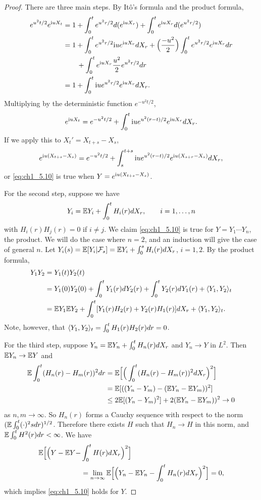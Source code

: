 \begin{proof}
There are three main steps. By It\^o's formula and the product formula,
\begin{align*}
    e^{u^2t/2}e^{\mathrm{i} uX_t} &= 1 + \int_0^t e^{u^2r/2}d(e^{\mathrm{i} u X_r}) + \int_0^t e^{\mathrm{i} u X_r}d(e^{u^2r/2}) \\
    &= 1 + \int_0^t e^{u^2r/2}\mathrm{i} ue^{\mathrm{i} uX_r}dX_r + \Big(\frac{-u^2}{2}\Big)\int_0^t e^{u^2r/2}e^{\mathrm{i} uX_r}dr \\
    &\qquad + \int_0^t e^{\mathrm{i} u X_r}\frac{u^2}{2}e^{u^2 r/2}dr \\
    &= 1 + \int_0^t \mathrm{i} ue^{u^2r/2}e^{\mathrm{i} uX_r}dX_r.
\end{align*}
Multiplying by the deterministic function $e^{-u^2t/2}$,
\[
    e^{\mathrm{i} uX_t} = e^{-u^2t/2} + \int_0^t \mathrm{i} ue^{u^2(r-t)/2}e^{\mathrm{i} uX_r}dX_r.
\]
If we apply this to $X_t'=X_{t+s}-X_s$,
\begin{equation}\label{eq:ch1_5.11}
    e^{\mathrm{i} u(X_{t+s}-X_s)} = e^{-u^2t/2} + \int_s^{t+s} \mathrm{i} ue^{u^2(r-t)/2}e^{\mathrm{i} u(X_{s+r}-X_s)}dX_r,
\end{equation}
or \eqref{eq:ch1_5.10} is true when $Y = e^{\mathrm{i} u(X_{t+s}-X_s)}$.

For the second step, suppose we have
\[
    Y_i = \mathbb{E} Y_i + \int_0^t H_i(r)dX_r, \qquad i=1,\ldots,n
\]
with $H_i(r)H_j(r) = 0$ if $i \neq j$. We claim \eqref{eq:ch1_5.10} is true for $Y = Y_1\cdots Y_n$, the product. We will do the case where $n = 2$, and an induction will give the case of general $n$. Let $Y_i(s) = \mathbb{E}[Y_i|\mathcal{F}_s] = \mathbb{E} Y_i + \int_0^s H_i(r)dX_r$, $i = 1,2$. By the product formula,
\begin{align*}
    Y_1Y_2 &=  Y_1(t)Y_2(t) \\
    &= Y_1(0)Y_2(0) + \int_0^t Y_1(r)dY_2(r) + \int_0^t Y_2(r)dY_1(r) + \langle Y_1,Y_2 \rangle_t \\
    &= \mathbb{E} Y_1 \mathbb{E} Y_2 + \int_0^t [Y_1(r)H_2(r) + Y_2(r)H_1(r)] dX_r + \langle Y_1,Y_2 \rangle_t.
\end{align*}
Note, however, that $\langle Y_1,Y_2 \rangle_t = \int_0^t H_1(r)H_2(r)dr = 0$.

For the third step, suppose $Y_n = \mathbb{E} Y_n + \int_0^t H_n(r)dX_r$ and $Y_n \to Y$ in $L^2$. Then $\mathbb{E} Y_n \to \mathbb{E} Y$ and
\mpagebreak
\begin{align*}
    \mathbb{E} \int_0^t (H_n(r)-H_m(r))^2 dr &= \mathbb{E} \Big[\Big(\int_0^t (H_n(r)-H_m(r))^2 dX_r \Big)^2\Big] \\
    &=\mathbb{E}[((Y_n-Y_m)-(\mathbb{E} Y_n - \mathbb{E} Y_m))^2] \\
    &\leq 2\mathbb{E}[(Y_n-Y_m)^2]+2(\mathbb{E} Y_n - \mathbb{E} Y_m))^2 \to 0
\end{align*}
as $n,m\to\infty$. So $H_{n}(r)$ forms a Cauchy sequence with respect to the norm $(\mathbb{E} \int_0^t (\cdot)^2sdr)^{1/2}$. Therefore there exists $H$ such that $H_n \to H$ in this norm, and $\mathbb{E} \int_0^t H^2(r)dr<\infty$. We have
\begin{align*}
    \mathbb{E}\Big[\Big(Y - \mathbb{E} Y - &\int_0^t H(r)dX_r\Big)^2\Big] \\
    &=\lim_{n\to\infty}\mathbb{E}\Big[\Big(Y_n - \mathbb{E} Y_n - \int_0^t H_n(r)dX_r\Big)^2\Big]=0,
\end{align*}
which implies \eqref{eq:ch1_5.10} holds for $Y$.


\end{proof}
